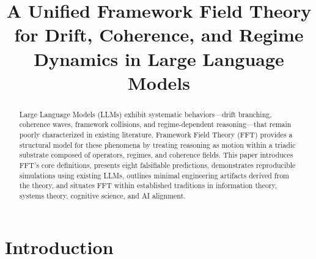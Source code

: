 \documentclass[conference]{IEEEtran}
\title{A Unified Framework Field Theory for Drift, Coherence, and Regime Dynamics in Large Language Models}
\author{
\IEEEauthorblockN{Nawder Loswin}
\IEEEauthorblockA{
TriadicFrameworks.org \\
Email: (optional)
}
}
\begin{document}
\maketitle

\begin{abstract}
Large Language Models (LLMs) exhibit systematic behaviors---drift branching, coherence waves, framework collisions, and regime-dependent reasoning---that remain poorly characterized in existing literature. Framework Field Theory (FFT) provides a structural model for these phenomena by treating reasoning as motion within a triadic substrate composed of operators, regimes, and coherence fields. This paper introduces FFT's core definitions, presents eight falsifiable predictions, demonstrates reproducible simulations using existing LLMs, outlines minimal engineering artifacts derived from the theory, and situates FFT within established traditions in information theory, systems theory, cognitive science, and AI alignment.
\end{abstract}

\section{Introduction}
\end{document}
